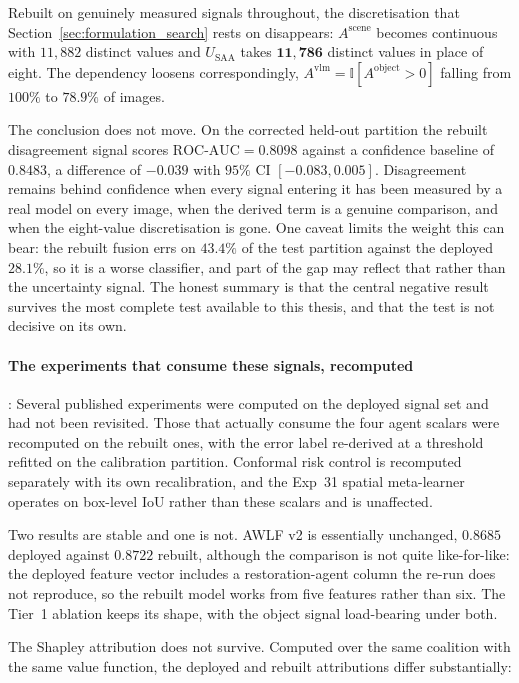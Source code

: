 \documentclass[12pt,a4paper]{report}
\begin{document}
\begin{enumerate}
Rebuilt on genuinely measured signals throughout, the discretisation that Section~\ref{sec:formulation_search} rests on disappears: $A^{\text{scene}}$ becomes continuous with $11{,}882$ distinct values and $U_{\text{SAA}}$ takes $\mathbf{11{,}786}$ distinct values in place of eight. The dependency loosens correspondingly, $A^{\text{vlm}} = \mathbb{I}[A^{\text{object}}>0]$ falling from $100\%$ to $78.9\%$ of images.

The conclusion does not move. On the corrected held-out partition the rebuilt disagreement signal scores $\text{ROC-AUC} = 0.8098$ against a confidence baseline of $0.8483$, a difference of $-0.039$ with $95\%$ CI $[-0.083, 0.005]$. Disagreement remains behind confidence when every signal entering it has been measured by a real model on every image, when the derived term is a genuine comparison, and when the eight-value discretisation is gone. One caveat limits the weight this can bear: the rebuilt fusion errs on $43.4\%$ of the test partition against the deployed $28.1\%$, so it is a worse classifier, and part of the gap may reflect that rather than the uncertainty signal. The honest summary is that the central negative result survives the most complete test available to this thesis, and that the test is not decisive on its own.

\paragraph{The experiments that consume these signals, recomputed}: Several published
experiments were computed on the deployed signal set and had not been revisited. Those that
actually consume the four agent scalars were recomputed on the rebuilt ones, with the error label
re-derived at a threshold refitted on the calibration partition. Conformal risk control is
recomputed separately with its own recalibration, and the Exp~31 spatial meta-learner operates on
box-level IoU rather than these scalars and is unaffected.

Two results are stable and one is not. AWLF v2 is essentially unchanged, $0.8685$ deployed against
$0.8722$ rebuilt, although the comparison is not quite like-for-like: the deployed feature vector
includes a restoration-agent column the re-run does not reproduce, so the rebuilt model works from
five features rather than six. The Tier~1 ablation keeps its shape, with the object signal
load-bearing under both.

The Shapley attribution does not survive. Computed over the same coalition with the same value
function, the deployed and rebuilt attributions differ substantially:


\end{enumerate}
\end{document}
